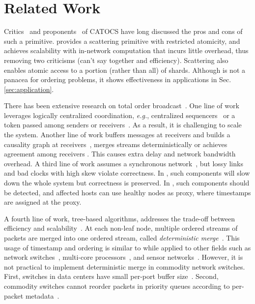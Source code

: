 \section{Related Work}
\label{sec:related}

Critics~\cite{cheriton1994understanding} and proponents~\cite{birman1994response,van1994bother} of CATOCS have long discussed the pros and cons of such a primitive.
\sys provides a scattering primitive with restricted atomicity, and achieves scalability with in-network computation that incurs little overhead, thus removing two criticisms (can't say together and efficiency).
Scattering also enables atomic access to a portion (rather than all) of shards.
Although \sys is not a panacea for ordering problems, it shows effectiveness in applications in Sec.\ref{sec:application}.

There has been extensive research on total order broadcast~\cite{defago2004total}.
One line of work leverages logically centralized coordination, \textit{e.g.}, centralized sequencers~\cite{birman1991lightweight,kaashoek1996evaluation,eris} or a token passed among senders or receivers~\cite{rajagopalan1989token,moser1996totem,kim1997total,ekwall2004token}.
As a result, it is challenging to scale the system.
Another line of work buffers messages at receivers and builds a causality graph at receivers~\cite{lamport1978time,peterson1989preserving}, merges streams deterministically or achieves agreement among receivers \cite{birman1987exploiting,chandra1996unreliable,pedone1998optimistic,junqueira2011zab}.
This causes extra delay and network bandwidth overhead.
A third line of work assumes a synchronous network~\cite{lamport1984using}, but lossy links and bad clocks with high skew violate correctness. In \sys{}, such components will slow down the whole system but correctness is preserved. In \sys{}, such components should be detected, and affected hosts can use healthy nodes as proxy, where timestamps are assigned at the proxy.

A fourth line of work, tree-based algorithms, addresses the trade-off between efficiency and scalability~\cite{rodrigues1998scalable}.
At each non-leaf node, multiple ordered streams of packets are merged into one ordered stream, called \textit{deterministic merge}~\cite{hadzilacos1994modular,aguilera2000efficient}.
This usage of timestamp and ordering is similar to \sys{} while applied to other fields such as network switches~\cite{network-switch-patent}, multi-core processors~\cite{kaestle2016machine}, and sensor networks~\cite{chakraborty2011reliable}.
However, it is not practical to implement deterministic merge in commodity network switches.
First, switches in data centers have small per-port buffer size~\cite{bai2017congestion}.
Second, commodity switches cannot reorder packets in priority queues according to per-packet metadata~\cite{sivaraman2016programmable,jin2018netchain}.


